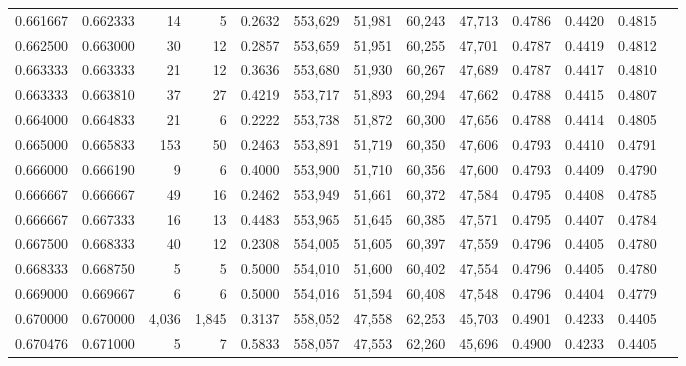 \begin{tabular}{rrrrrrrrrrrrr}
0.661667 & 0.662333 &     14 &     5 &                                     0.2632 & 553,629 &  51,981 &  60,243 &  47,713 & 0.4786 & 0.4420 & 0.4815 \\
0.662500 & 0.663000 &     30 &    12 &                                     0.2857 & 553,659 &  51,951 &  60,255 &  47,701 & 0.4787 & 0.4419 & 0.4812 \\
0.663333 & 0.663333 &     21 &    12 &                                     0.3636 & 553,680 &  51,930 &  60,267 &  47,689 & 0.4787 & 0.4417 & 0.4810 \\
0.663333 & 0.663810 &     37 &    27 &                                     0.4219 & 553,717 &  51,893 &  60,294 &  47,662 & 0.4788 & 0.4415 & 0.4807 \\
0.664000 & 0.664833 &     21 &     6 &                                     0.2222 & 553,738 &  51,872 &  60,300 &  47,656 & 0.4788 & 0.4414 & 0.4805 \\
0.665000 & 0.665833 &    153 &    50 &                                     0.2463 & 553,891 &  51,719 &  60,350 &  47,606 & 0.4793 & 0.4410 & 0.4791 \\
0.666000 & 0.666190 &      9 &     6 &                                     0.4000 & 553,900 &  51,710 &  60,356 &  47,600 & 0.4793 & 0.4409 & 0.4790 \\
0.666667 & 0.666667 &     49 &    16 &                                     0.2462 & 553,949 &  51,661 &  60,372 &  47,584 & 0.4795 & 0.4408 & 0.4785 \\
0.666667 & 0.667333 &     16 &    13 &                                     0.4483 & 553,965 &  51,645 &  60,385 &  47,571 & 0.4795 & 0.4407 & 0.4784 \\
0.667500 & 0.668333 &     40 &    12 &                                     0.2308 & 554,005 &  51,605 &  60,397 &  47,559 & 0.4796 & 0.4405 & 0.4780 \\
0.668333 & 0.668750 &      5 &     5 &                                     0.5000 & 554,010 &  51,600 &  60,402 &  47,554 & 0.4796 & 0.4405 & 0.4780 \\
0.669000 & 0.669667 &      6 &     6 &                                     0.5000 & 554,016 &  51,594 &  60,408 &  47,548 & 0.4796 & 0.4404 & 0.4779 \\
0.670000 & 0.670000 &  4,036 & 1,845 &                                     0.3137 & 558,052 &  47,558 &  62,253 &  45,703 & 0.4901 & 0.4233 & 0.4405 \\
0.670476 & 0.671000 &      5 &     7 &                                     0.5833 & 558,057 &  47,553 &  62,260 &  45,696 & 0.4900 & 0.4233 & 0.4405 \\

\end{tabular}
